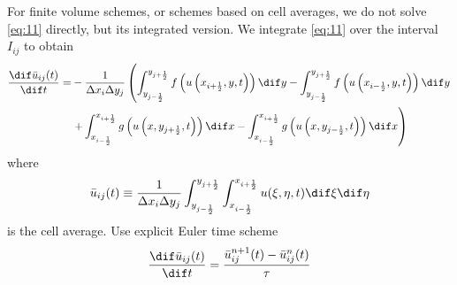 \documentclass[12pt]{article}
\begin{document}
For finite volume schemes, or schemes based
on cell averages, we do not solve \cref{eq:11} directly, but its integrated version. We integrate \cref{eq:11} over the
interval $I_{i j}$ to obtain
\begin{equation}
	\begin{aligned}
		\frac{\dif \bar{u}_{i j}(t)}{\dif t}= & -\frac{1}{\Delta x_{i} \Delta y_{j}}\left(\int _ { y _ { j - \frac { 1 } { 2 } } } ^ { y _ { j + \frac { 1 } { 2 } } } f \left(u\left(x_{i+\frac{1}{2}}, y, t\right)\right) \dif y-\int_{y_{j-\frac{1}{2}}}^{y_{j+\frac{1}{2}}} f\left(u\left(x_{i-\frac{1}{2}}, y, t\right)\right) \dif y\right. \\
		                                      & \left.+\int_{x_{i-\frac{1}{2}}}^{x_{i+\frac{1}{2}}} g\left(u\left(x, y_{j+\frac{1}{2}}, t\right)\right) \dif x-\int_{x_{i-\frac{1}{2}}}^{x_{i+\frac{1}{2}}} g\left(u\left(x, y_{j-\frac{1}{2}}, t\right)\right) \dif x\right)
	\end{aligned}
	\label{eq:1pde}
\end{equation}
where
\begin{equation}
	\bar{u}_{i j}(t) \equiv \frac{1}{\Delta x_{i} \Delta y_{j}} \int_{y_{j-\frac{1}{2}}}^{y_{j+\frac{1}{2}}} \int_{x_{i-\frac{1}{2}}}^{x_{i+\frac{1}{2}}} u(\xi, \eta, t) \dif \xi \dif \eta
\end{equation}
is the cell average. Use explicit Euler time scheme
\begin{equation}
	\frac{\dif \bar{u}_{i j}(t)}{\dif t}=\frac{\bar{u}^{n+1}_{i j}(t)-\bar{u}^{n}_{i j}(t)}{\tau}
\end{equation}
\end{document}
